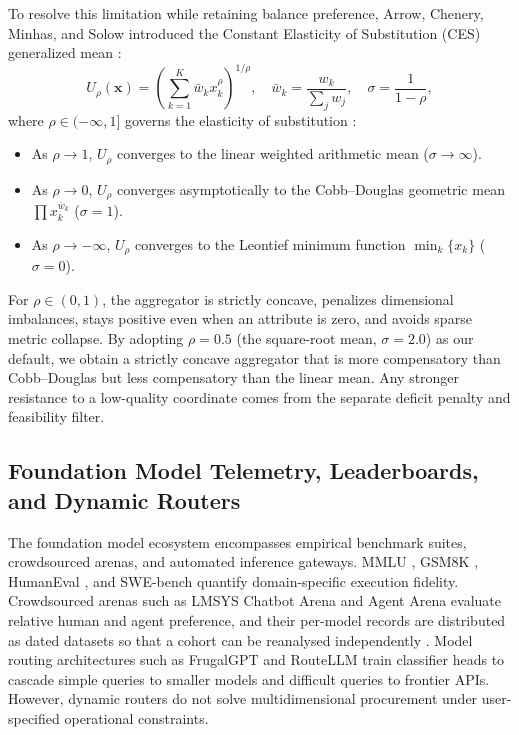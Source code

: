 \documentclass[pdflatex,sn-mathphys-num]{sn-jnl}
\theoremstyle{thmstyleone}
\theoremstyle{thmstylethree}
\begin{document}
To resolve this limitation while retaining balance preference, Arrow, Chenery, Minhas, and Solow introduced the Constant Elasticity of Substitution (CES) generalized mean \cite{arrow1961capital}:
\begin{equation}\label{eq:ces_general}
U_{\rho}(\mathbf{x}) = \left( \sum_{k=1}^K \bar{w}_k x_k^\rho \right)^{1/\rho}, \quad \bar{w}_k = \frac{w_k}{\sum_j w_j}, \quad \sigma = \frac{1}{1 - \rho},
\end{equation}
where $\rho \in (-\infty, 1]$ governs the elasticity of substitution \cite{hardy1934inequalities}:
\begin{itemize}
  \item As $\rho \to 1$, $U_\rho$ converges to the linear weighted arithmetic mean ($\sigma \to \infty$).
  \item As $\rho \to 0$, $U_\rho$ converges asymptotically to the Cobb--Douglas geometric mean $\prod x_k^{\bar{w}_k}$ ($\sigma = 1$).
  \item As $\rho \to -\infty$, $U_\rho$ converges to the Leontief minimum function $\min_k \{x_k\}$ ($\sigma = 0$).
\end{itemize}
For $\rho \in (0, 1)$, the aggregator is strictly concave, penalizes dimensional imbalances, stays positive even when an attribute is zero, and avoids sparse metric collapse. By adopting $\rho = 0.5$ (the square-root mean, $\sigma = 2.0$) as our default, we obtain a strictly concave aggregator that is more compensatory than Cobb--Douglas but less compensatory than the linear mean. Any stronger resistance to a low-quality coordinate comes from the separate deficit penalty and feasibility filter.

\subsection{Foundation Model Telemetry, Leaderboards, and Dynamic Routers}

The foundation model ecosystem encompasses empirical benchmark suites, crowdsourced arenas, and automated inference gateways. MMLU \cite{hendrycks2020measuring}, GSM8K \cite{cobbe2021gsm8k}, HumanEval \cite{chen2021evaluating}, and SWE-bench \cite{jimenez2023swe} quantify domain-specific execution fidelity. Crowdsourced arenas such as LMSYS Chatbot Arena \cite{zheng2024judging} and Agent Arena evaluate relative human and agent preference, and their per-model records are distributed as dated datasets so that a cohort can be reanalysed independently \cite{arena2025}. Model routing architectures such as FrugalGPT \cite{chen2023frugalgpt} and RouteLLM \cite{ong2024routellm} train classifier heads to cascade simple queries to smaller models and difficult queries to frontier APIs. However, dynamic routers do not solve multidimensional procurement under user-specified operational constraints.
\end{document}

